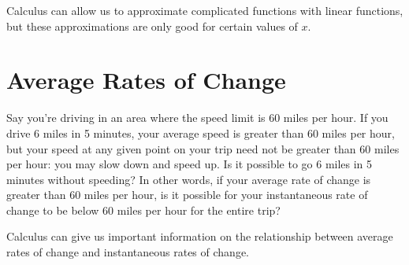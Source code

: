 \documentclass{ximera}
\begin{document}
Calculus can allow us to approximate complicated functions with linear functions, but these approximations are only good for certain values of $x$. 

\section{Average Rates of Change}
Say you're driving in an area where the speed limit is 60 miles per hour. If you drive 6 miles in 5 minutes, your average speed is greater than 60 miles per hour, but your speed at any given point on your trip need not be greater than 60 miles per hour: you may slow down and speed up. Is it possible to go 6 miles in 5 minutes without speeding? In other words, if your average rate of change is greater than 60 miles per hour, is it possible for your instantaneous rate of change to be below 60 miles per hour for the entire trip?

Calculus can give us important information on the relationship between average rates of change and instantaneous rates of change. 
\end{document}
